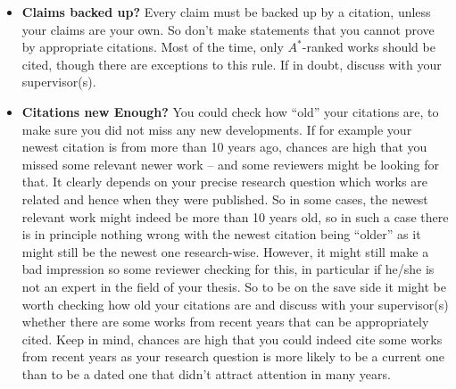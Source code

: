 \begin{itemize}
  \item \textbf{Claims backed up?} Every claim must be backed up by a citation, unless your claims are your own. So don't make statements that you cannot prove by appropriate citations. Most of the time, only $A^*$-ranked works should be cited, though there are exceptions to this rule. If in doubt, discuss with your supervisor(s). 
  
  \item \textbf{Citations new Enough?} You could check how ``old'' your citations are, to make sure you did not miss any new developments. If for example your newest citation is from more than 10 years ago, chances are high that you missed some relevant newer work -- and some reviewers might be looking for that. It clearly depends on your precise research question which works are related and hence when they were published. So in some cases, the newest relevant work might indeed be more than 10 years old, so in such a case there is in principle nothing wrong with the newest citation being ``older'' as it might still be the newest one research-wise. However, it might still make a bad impression so some reviewer checking for this, in particular if he/she is not an expert in the field of your thesis. So to be on the save side it might be worth checking how old your citations are and discuss with your supervisor(s) whether there are some works from recent years that can be appropriately cited. Keep in mind, chances are high that you could indeed cite some works from recent years as your research question is more likely to be a current one than to be a dated one that didn't attract attention in many years.
  

\end{itemize}
